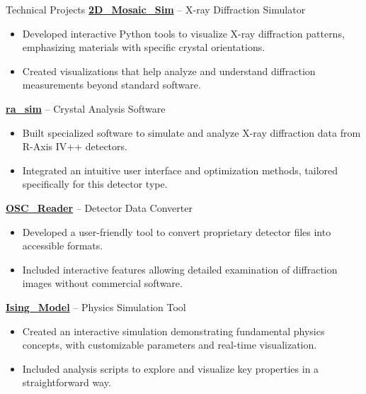\begin{rubric}{Technical Projects}
\entry*[2025--Present]%
  \textbf{\href{https://github.com/DVBeckwitt/2D_Mosaic_Sim}{2D\_Mosaic\_Sim}} – X-ray Diffraction Simulator%
  \begin{itemize}
    \item Developed interactive Python tools to visualize X-ray diffraction patterns, emphasizing materials with specific crystal orientations.
    \item Created visualizations that help analyze and understand diffraction measurements beyond standard software.
  \end{itemize}

  \entry*[2024--Present]%
  \textbf{\href{https://github.com/DVBeckwitt/ra_sim}{ra\_sim}} – Crystal Analysis Software%
  \begin{itemize}
    \item Built specialized software to simulate and analyze X-ray diffraction data from R-Axis IV++ detectors.
    \item Integrated an intuitive user interface and optimization methods, tailored specifically for this detector type.
  \end{itemize}

  \entry*[2024]%
  \textbf{\href{https://github.com/DVBeckwitt/OSC_Reader}{OSC\_Reader}} – Detector Data Converter%
  \begin{itemize}
    \item Developed a user-friendly tool to convert proprietary detector files into accessible formats.
    \item Included interactive features allowing detailed examination of diffraction images without commercial software.
  \end{itemize}

  \entry*[2025]%
  \textbf{\href{https://github.com/DVBeckwitt/Ising_Model}{Ising\_Model}} – Physics Simulation Tool%
  \begin{itemize}
    \item Created an interactive simulation demonstrating fundamental physics concepts, with customizable parameters and real-time visualization.
    \item Included analysis scripts to explore and visualize key properties in a straightforward way.
  \end{itemize}
\end{rubric}